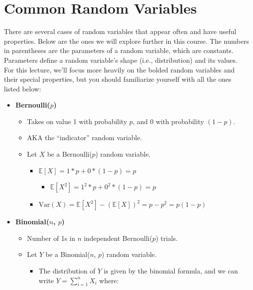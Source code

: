 \documentclass[
  letterpaper,
  DIV=11,
  numbers=noendperiod]{scrreprt}
\providecommand{\tightlist}{%
  \setlength{\itemsep}{0pt}\setlength{\parskip}{0pt}}\usepackage{longtable,booktabs,array}
\begin{document}
\section{Common Random Variables}\label{common-random-variables}

There are several cases of random variables that appear often and have
useful properties. Below are the ones we will explore further in this
course. The numbers in parentheses are the parameters of a random
variable, which are constants. Parameters define a random variable's
shape (i.e., distribution) and its values. For this lecture, we'll focus
more heavily on the bolded random variables and their special
properties, but you should familiarize yourself with all the ones listed
below:

\begin{itemize}
\tightlist
\item
  \textbf{Bernoulli(\(p\))}

  \begin{itemize}
  \tightlist
  \item
    Takes on value 1 with probability \(p\), and 0 with probability
    \((1 - p)\).
  \item
    AKA the ``indicator'' random variable.
  \item
    Let \(X\) be a Bernoulli(\(p\)) random variable.

    \begin{itemize}
    \tightlist
    \item
      \(\mathbb{E}[X] = 1 * p + 0 * (1-p) = p\)

      \begin{itemize}
      \tightlist
      \item
        \(\mathbb{E}[X^2] = 1^2 * p + 0^2 * (1-p) = p\)
      \end{itemize}
    \item
      \(\text{Var}(X) = \mathbb{E}[X^2] - (\mathbb{E}[X])^2 = p - p^2 = p(1-p)\)
    \end{itemize}
  \end{itemize}
\item
  \textbf{Binomial(\(n\), \(p\))}

  \begin{itemize}
  \tightlist
  \item
    Number of 1s in \(n\) independent Bernoulli(\(p\)) trials.
  \item
    Let \(Y\) be a Binomial(\(n\), \(p\)) random variable.

    \begin{itemize}
    \tightlist
    \item
      The distribution of \(Y\) is given by the binomial formula, and we
      can write \(Y = \sum_{i=1}^n X_i\) where:


\end{itemize}
\end{itemize}
\end{itemize}
\end{document}
